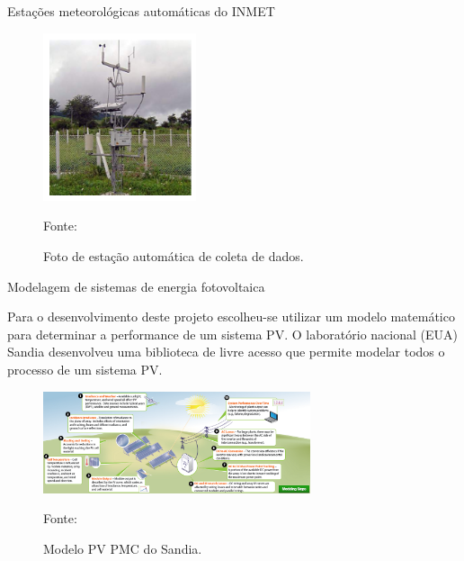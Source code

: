 \documentclass{beamer}
\begin{document}
\begin{frame}{Estações meteorológicas automáticas do INMET}

\begin{figure}[H]
    \centering
    \includegraphics[width=0.4\textwidth]{./Figuras/estacao_meteorologicas.png}
    \caption{Foto de estação automática de coleta de dados.}{Fonte: \cite{atlas2017}}
   \label{fig:estacao_meteorologicas}
\end{figure}


\end{frame}


\begin{frame}{Modelagem de sistemas de energia fotovoltaica}

Para o desenvolvimento deste projeto escolheu-se utilizar um modelo matemático para determinar a performance de um sistema PV. O laboratório nacional (EUA) Sandia desenvolveu uma biblioteca de livre acesso que permite modelar todos o processo de um sistema PV.

\begin{figure}[H]
    \centering
    \includegraphics[width=0.7\textwidth]{./Figuras/sandia_model.png}
    \caption{Modelo PV PMC do Sandia.}{Fonte: \cite{sandia}}
   \label{fig:sandia_model}
\end{figure}

\end{frame}


\end{document}
